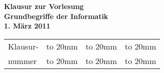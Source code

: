 \documentclass[12pt,twoside]{report}
\renewcommand{\#}[1]{\textup{\texttt{#1}}}
\begin{document}
\thispagestyle{empty}

\begin{center}
  \bfseries \Large
  Klausur zur Vorlesung \\
  Grundbegriffe der Informatik \\
  1. M\"arz 2011 \\[8mm]
  \begin{tabular}{l@{\quad}|c|c|c|}
    \cline{2-4}
    Klausur- &
    \hbox to 20mm{\hss \vrule width 0pt height 8mm depth 1mm}&
    \hbox to 20mm{\hss \vrule width 0pt height 8mm depth 1mm}&
    \hbox to 20mm{\hss \vrule width 0pt height 8mm depth 1mm}\\
    nummer &
    \hbox to 20mm{\hss \vrule width 0pt height 6mm depth 5mm}&
    \hbox to 20mm{\hss \vrule width 0pt height 6mm depth 5mm}&
    \hbox to 20mm{\hss \vrule width 0pt height 6mm depth 5mm}\\
    \cline{2-4}
  \end{tabular}

\end{center}
\end{document}
